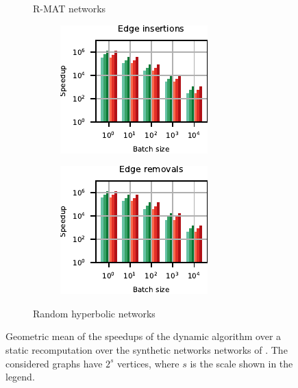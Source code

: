 \begin{figure}[t]
\begin{subfigure}[b]{.5\textwidth}
\begin{subfigure}[b]{.5\textwidth}
\end{subfigure}
\caption{R-MAT networks}
\label{fig:dyn-mwm:speedup-rmat}
\end{subfigure}\hfill
\begin{subfigure}[b]{.5\textwidth}
\begin{subfigure}[b]{.5\textwidth}
\centering
\includegraphics[width=.9\textwidth]{sources/plots/dyn-mwm/speedup-hyperbolic-insertion.pdf}
\end{subfigure}\hfill
\begin{subfigure}[b]{.5\textwidth}
\centering
\includegraphics[width=.9\textwidth]{sources/plots/dyn-mwm/speedup-hyperbolic-removal.pdf}
\end{subfigure}
\caption{Random hyperbolic networks}
\label{fig:dyn-mwm:speedup-hyp}
\end{subfigure}
\caption{Geometric mean of the speedups of the dynamic algorithm over a static
recomputation over the synthetic networks networks of
. The considered graphs have $2^s$ vertices, where
$s$ is the scale shown in the legend.}
\label{fig:dyn-mwm:speedup-synthetic}
\end{figure}

